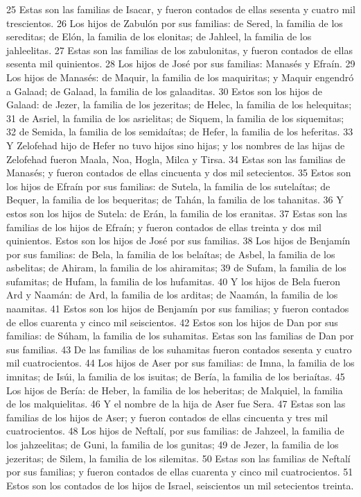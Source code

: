 25 Estas son las familias de Isacar, y fueron contados de ellas sesenta y cuatro mil trescientos.
26 Los hijos de Zabulón por sus familias: de Sered, la familia de los sereditas; de Elón, la familia de los elonitas; de Jahleel, la familia de los jahleelitas.
27 Estas son las familias de los zabulonitas, y fueron contados de ellas sesenta mil quinientos.
28 Los hijos de José por sus familias: Manasés y Efraín.
29 Los hijos de Manasés: de Maquir, la familia de los maquiritas; y Maquir engendró a Galaad; de Galaad, la familia de los galaaditas.
30 Estos son los hijos de Galaad: de Jezer, la familia de los jezeritas; de Helec, la familia de los helequitas;
31 de Asriel, la familia de los asrielitas; de Siquem, la familia de los siquemitas;
32 de Semida, la familia de los semidaítas; de Hefer, la familia de los heferitas.
33 Y Zelofehad hijo de Hefer no tuvo hijos sino hijas; y los nombres de las hijas de Zelofehad fueron Maala, Noa, Hogla, Milca y Tirsa.
34 Estas son las familias de Manasés; y fueron contados de ellas cincuenta y dos mil setecientos.
35 Estos son los hijos de Efraín por sus familias: de Sutela, la familia de los sutelaítas; de Bequer, la familia de los bequeritas; de Tahán, la familia de los tahanitas.
36 Y estos son los hijos de Sutela: de Erán, la familia de los eranitas.
37 Estas son las familias de los hijos de Efraín; y fueron contados de ellas treinta y dos mil quinientos. Estos son los hijos de José por sus familias.
38 Los hijos de Benjamín por sus familias: de Bela, la familia de los belaítas; de Asbel, la familia de los asbelitas; de Ahiram, la familia de los ahiramitas;
39 de Sufam, la familia de los sufamitas; de Hufam, la familia de los hufamitas.
40 Y los hijos de Bela fueron Ard y Naamán: de Ard, la familia de los arditas; de Naamán, la familia de los naamitas.
41 Estos son los hijos de Benjamín por sus familias; y fueron contados de ellos cuarenta y cinco mil seiscientos.
42 Estos son los hijos de Dan por sus familias: de Súham, la familia de los suhamitas. Estas son las familias de Dan por sus familias.
43 De las familias de los suhamitas fueron contados sesenta y cuatro mil cuatrocientos.
44 Los hijos de Aser por sus familias: de Imna, la familia de los imnitas; de Isúi, la familia de los isuitas; de Bería, la familia de los beriaítas.
45 Los hijos de Bería: de Heber, la familia de los heberitas; de Malquiel, la familia de los malquielitas.
46 Y el nombre de la hija de Aser fue Sera.
47 Estas son las familias de los hijos de Aser; y fueron contados de ellas cincuenta y tres mil cuatrocientos.
48 Los hijos de Neftalí, por sus familias: de Jahzeel, la familia de los jahzeelitas; de Guni, la familia de los gunitas;
49 de Jezer, la familia de los jezeritas; de Silem, la familia de los silemitas.
50 Estas son las familias de Neftalí por sus familias; y fueron contados de ellas cuarenta y cinco mil cuatrocientos.
51 Estos son los contados de los hijos de Israel, seiscientos un mil setecientos treinta.
